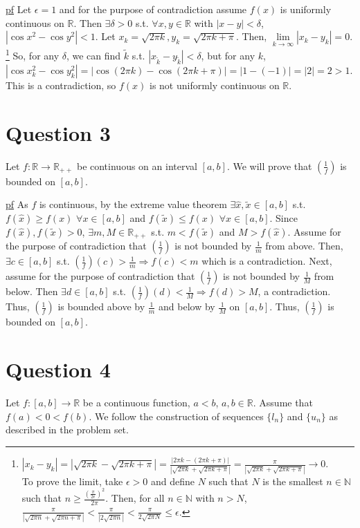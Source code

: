 \documentclass[11pt]{article} %
\begin{document}
\underline{pf} Let $\epsilon = 1$ and for the purpose of contradiction assume $f(x)$ is uniformly continuous on $\mathbb{R}$. Then $\exists \delta>0$ s.t. $\forall x,y \in \mathbb{R} $ with $|x - y|<\delta$, $|\cos{x^2} - \cos{y^2}|<1.$ Let $x_k = \sqrt{2 \pi k}, y_k = \sqrt{2 \pi k + \pi }.$ Then, $\lim\limits_{k \rightarrow \infty } |x_k - y_k| = 0.$\footnote{$|x_k - y_k| = |\sqrt{2 \pi k} - \sqrt{2 \pi k + \pi}| = \frac{|2 \pi k - (2 \pi k + \pi)|}{|\sqrt{2 \pi k} + \sqrt{2 \pi k + \pi }|} = \frac{\pi}{|\sqrt{2 \pi k} + \sqrt{2 \pi k + \pi}|} \rightarrow 0$.\\ To prove the limit, take $\epsilon >0$ and define $N$ such that $N$ is the smallest $n \in \mathbb{N}$ such that $n \geq \frac{\left( \frac{\pi}{2\epsilon}\right)^2}{2 \pi}$. Then, for all $n \in \mathbb{N}$ with $n>N$,  $\frac{\pi}{|\sqrt{2 \pi n} + \sqrt{2 \pi n + \pi}|} < \frac{\pi}{|2\sqrt{2 \pi n}|} < \frac{\pi}{2\sqrt{2 \pi N}} \leq \epsilon$.} So, for any $\delta$, we can find $\tilde{k}$ s.t. $|x_{\tilde{k}} - y_{\tilde{k}}| < \delta$, but for any $k$, $|\cos{x_k^2} - \cos{y_k^2}| = |\cos{(2 \pi k)} - \cos{(2 \pi k + \pi)}| = |1 - (-1)| = |2| = 2 > 1.$ This is a contradiction, so $f(x)$ is not uniformly continuous on $\mathbb{R}$.
\section{Question 3}
Let $f: \mathbb{R} \rightarrow \mathbb{R}_{++}$ be continuous on an interval $[a,b]$. We will prove that $(\frac{1}{f})$ is bounded on $[a,b]$.

\underline{pf} As $f$ is continuous, by the extreme value theorem $\exists \hat{x},\tilde{x} \in [a,b]$ s.t. $f(\hat{x}) \geq f(x)$ $\forall x \in [a,b]$ and $f(\tilde{x}) \leq f(x)$ $\forall x \in [a,b]$. Since $f(\hat{x}),f(\tilde{x}) >0$, $\exists m,M \in \mathbb{R_{++}}$ s.t. $m <f(\tilde{x})$ and $M > f(\hat{x})$. Assume for the purpose of contradiction that $(\frac{1}{f})$ is not bounded by $\frac{1}{m}$ from above. Then, $\exists c \in [a,b]$ s.t. $(\frac{1}{f})(c) >\frac{1}{m} \Rightarrow f(c) < m$ which is a contradiction. Next, assume for the purpose of contradiction that $(\frac{1}{f})$ is not bounded by $\frac{1}{M}$ from below. Then $\exists d \in [a,b]$ s.t. $(\frac{1}{f})(d) < \frac{1}{M} \Rightarrow f(d) > M$, a contradiction. Thus, $(\frac{1}{f})$ is bounded above by $\frac{1}{m}$ and below by $\frac{1}{M}$ on $[a,b]$. Thus, $(\frac{1}{f})$ is bounded on $[a,b]$.

\section{Question 4}
Let $f:[a,b] \rightarrow \mathbb{R}$ be a continuous function, $a<b$, $a,b \in \mathbb{R}.$ Assume that $f(a) < 0 < f(b)$. We follow the construction of sequences $\{ l_n \}$ and $\{ u_n \}$ as described in the problem set.
\end{document}
